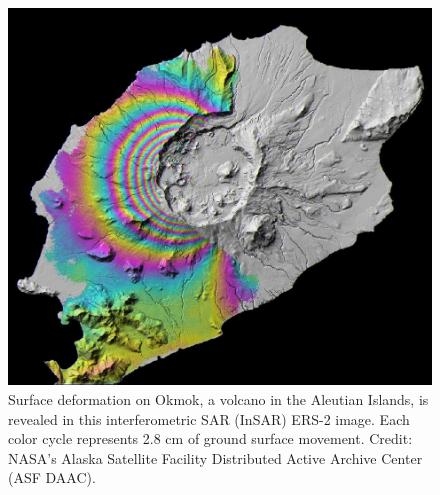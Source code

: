 \documentclass{article}
\begin{document}
\begin{figure}
    \centering
    \includegraphics[width=1\linewidth]{images/sar-interferometry-okmok-volcano.jpg}
    \caption{Surface deformation on Okmok, a volcano in the Aleutian Islands, is revealed in this interferometric SAR (InSAR) ERS-2 image. Each color cycle represents 2.8 cm of ground surface movement. Credit: NASA’s Alaska Satellite Facility Distributed Active Archive Center (ASF DAAC).}
    \label{figure18}
\end{figure}

\end{document}

